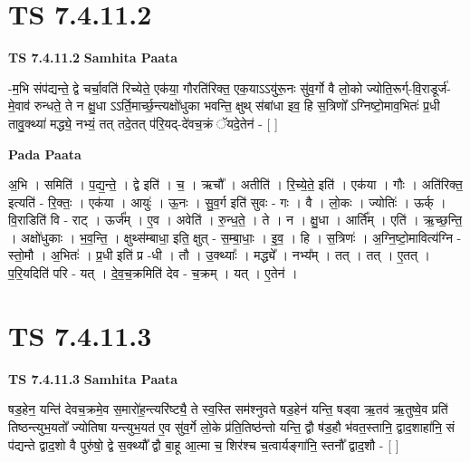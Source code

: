 \documentclass[17pt]{extarticle}
\begin{document}

\section{ TS 7.4.11.2 }

\textbf{TS 7.4.11.2 } \newline
\textbf{Samhita Paata} \newline

-म॒भि संप॑द्यन्ते॒ द्वे चर्चा॒वति॑ रिच्येते॒ एक॑या॒ गौरति॑रिक्त॒ एक॒याऽऽयु॑रू॒नः सु॑व॒र्गो वै लो॒को ज्योति॒रूर्ग्-वि॒राडूर्ज॑-मे॒वाव॑ रुन्धते॒ ते न क्षु॒धा ऽऽर्ति॒मार्च्छ॒न्त्यक्षो॑धुका भवन्ति॒ क्षुथ् स॑बांधा इव॒ हि स॒त्रिणो᳚ ऽग्निष्टो॒माव॒भितः॑ प्र॒धी तावु॒क्थ्या॑ मद्ध्ये॒ नभ्यं॒ तत् तदे॒तत् प॑रि॒यद्-दे॑वच॒क्रं ॅयदे॒तेन॑ - [  ] \newline

\textbf{Pada Paata} \newline

अ॒भि । समिति॑ । प॒द्य॒न्ते॒ । द्वे इति॑ । च॒ । ऋचौ᳚ । अतीति॑ । रि॒च्ये॒ते॒ इति॑ । एक॑या । गौः । अति॑रिक्त॒ इत्यति॑ - रि॒क्तः॒ । एक॑या । आयुः॑ । ऊ॒नः । सु॒व॒र्ग इति॑ सुवः - गः । वै । लो॒कः । ज्योतिः॑ । ऊर्क् । वि॒राडिति॑ वि - राट् । ऊर्ज᳚म् । ए॒व । अवेति॑ । रु॒न्ध॒ते॒ । ते । न । क्षु॒धा । आर्ति᳚म् । एति॑ । ऋ॒च्छ॒न्ति॒ । अक्षो॑धुकाः । भ॒व॒न्ति॒ । क्षुथ्स॑म्बाधा॒ इति॒ क्षुत् - स॒म्बा॒धाः॒ । इ॒व॒ । हि । स॒त्रिणः॑ । अ॒ग्नि॒ष्टो॒मावित्य॑ग्नि - स्तो॒मौ । अ॒भितः॑ । प्र॒धी इति॑ प्र -धी । तौ । उ॒क्थ्याः᳚ । मद्ध्ये᳚ । नभ्य᳚म् । तत् । तत् । ए॒तत् । प॒रि॒यदिति॑ परि - यत् । दे॒व॒च॒क्रमिति॑ देव - च॒क्रम् । यत् । ए॒तेन॑ ।  \newline





\section{ TS 7.4.11.3 }

\textbf{TS 7.4.11.3 } \newline
\textbf{Samhita Paata} \newline

षड॒हेन॒ यन्ति॑ देवच॒क्रमे॒व स॒मारो॑ह॒न्त्यरि॑ष्ट्यै॒ ते स्व॒स्ति सम॑श्नुवते षड॒हेन॑ यन्ति॒ षड्वा ऋ॒तव॑ ऋ॒तुष्वे॒व प्रति॑ तिष्ठन्त्युभ॒यतो᳚ ज्योतिषा यन्त्युभ॒यत॑ ए॒व सु॑व॒र्गे लो॒के प्र॑ति॒तिष्ठ॑न्तो यन्ति॒ द्वौ ष॑ड॒हौ भ॑वत॒स्तानि॒ द्वाद॒शाहा॑नि॒ सं प॑द्यन्ते द्वाद॒शो वै पुरु॑षो॒ द्वे स॒क्थ्यौ᳚ द्वौ बा॒हू आ॒त्मा च॒ शिर॑श्च च॒त्वार्यङ्गा॑नि॒ स्तनौ᳚ द्वाद॒शौ - [  ] \newline
\end{document}
